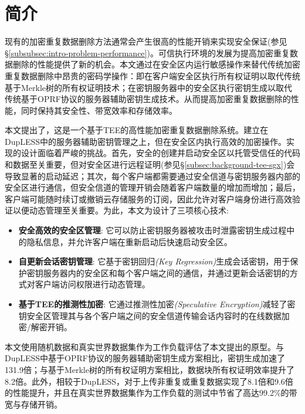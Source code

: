 \section{简介}
\label{sec:sgxdedup-introduction}

现有的加密重复数据删除方法通常会产生很高的性能开销来实现安全保证(参见\S\ref{subsubsec:intro-problem-performance})。可信执行环境的发展为提高加密重复数据删除的性能提供了新的机会。本文通过在安全区内运行敏感操作来替代传统加密重复数据删除中昂贵的密码学操作：即在客户端安全区执行所有权证明以取代传统基于Merkle树的所有权证明技术；在密钥服务器中的安全区执行密钥生成以取代传统基于OPRF协议的服务器辅助密钥生成技术。从而提高加密重复数据删除的性能，同时保持其安全性、带宽效率和存储效率。

本文提出了\sysnameS，这是一个基于TEE的高性能加密重复数据删除系统。\sysnameS 建立在DupLESS中的服务器辅助密钥管理之上，但在安全区内执行高效的加密操作。实现\sysnameS 的设计面临着严峻的挑战。首先，安全的创建并启动安全区以托管受信任的代码和数据至关重要，但对安全区进行远程证明(参见\S\ref{subsec:background-tee-sgx})会导致显著的启动延迟；其次，每个客户端都需要通过安全信道与密钥服务器内部的安全区进行通信，但安全信道的管理开销会随着客户端数量的增加而增加；最后，客户端可能随时续订或撤销云存储服务的订阅，因此允许对客户端身份进行高效验证以便动态管理至关重要。为此，本文为\sysnameS 设计了三项核心技术:

\begin{itemize}[leftmargin=0em]
    \item \textbf{安全高效的安全区管理}:
          它可以防止密钥服务器被攻击时泄露密钥生成过程中的隐私信息，并允许客户端在重新启动后快速启动安全区。
    \item \textbf{自更新会话密钥管理}:
          它基于密钥回归\textit{(Key Regression)}生成会话密钥，用于保护密钥服务器内的安全区和每个客户端之间的通信，并通过更新会话密钥的方式对客户端访问权限进行动态管理。
    \item \textbf{基于TEE的推测性加密}:
          它通过推测性加密\textit{(Speculative Encryption)}减轻了密钥安全区管理其与各个客户端之间的安全信道传输会话内容时的在线数据加密/解密开销。
\end{itemize}

本文使用随机数据和真实世界数据集作为工作负载评估了本文提出的\sysnameS 原型。与DupLESS中基于OPRF协议的服务器辅助密钥生成方案相比，密钥生成加速了131.9倍；与基于Merkle树的所有权证明方案相比，数据块所有权证明效率提升了8.2倍。此外，相较于DupLESS，\sysnameS 对于上传非重复或重复数据实现了8.1倍和9.6倍的性能提升，并且在真实世界数据集作为工作负载的测试中节省了高达99.2\%的带宽与存储开销。

